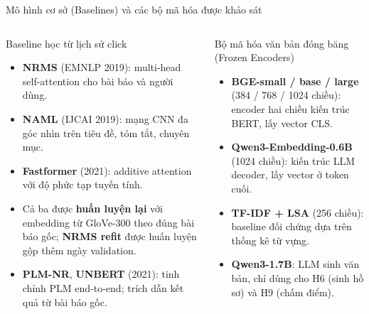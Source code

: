 \documentclass[aspectratio=169,t]{beamer}
\begin{document}
\begin{frame}[shrink]{Mô hình cơ sở (Baselines) và các bộ mã hóa được khảo sát}
\begin{columns}[T,onlytextwidth]
\begin{block}{Baseline học từ lịch sử click}
\scriptsize
\begin{itemize}
  \setlength{\itemsep}{1pt}
  \item \textbf{NRMS} (EMNLP 2019): multi-head self-attention cho bài báo và người dùng.
  \item \textbf{NAML} (IJCAI 2019): mạng CNN đa góc nhìn trên tiêu đề, tóm tắt, chuyên mục.
  \item \textbf{Fastformer} (2021): additive attention với độ phức tạp tuyến tính.
  \item Cả ba được \textbf{huấn luyện lại} với embedding từ GloVe-300 theo đúng bài báo gốc; \textbf{NRMS refit} được huấn luyện gộp thêm ngày validation.
  \item \textbf{PLM-NR}, \textbf{UNBERT} (2021): tinh chỉnh PLM end-to-end; trích dẫn kết quả từ bài báo gốc.
\end{itemize}
\end{block}
\begin{block}{Bộ mã hóa văn bản đóng băng (Frozen Encoders)}
\scriptsize
\begin{itemize}
  \setlength{\itemsep}{1pt}
  \item \textbf{BGE-small / base / large} (384 / 768 / 1024 chiều): encoder hai chiều kiến trúc BERT, lấy vector CLS.
  \item \textbf{Qwen3-Embedding-0.6B} (1024 chiều): kiến trúc LLM decoder, lấy vector ở token cuối.
  \item \textbf{TF-IDF + LSA} (256 chiều): baseline đối chứng dựa trên thống kê từ vựng.
  \item \textbf{Qwen3-1.7B}: LLM sinh văn bản, chỉ dùng cho H6 (sinh hồ sơ) và H9 (chấm điểm).
\end{itemize}
\end{block}
\end{columns}
\par\kern0pt%
\end{frame}
\end{document}
